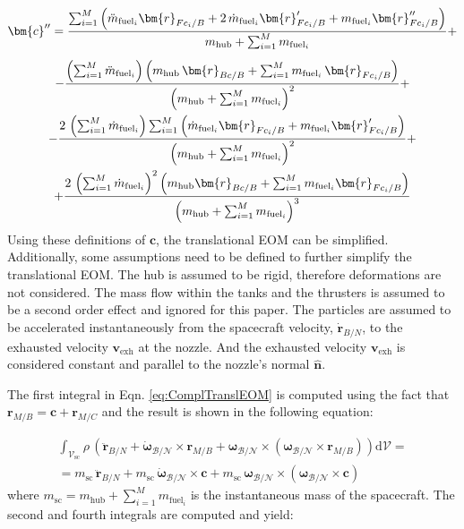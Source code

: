\begin{multline}\label{eq:eq18}
	\bm{c}'' = \frac{\sum_{i=1}^{M}\left(\ddot{m}_{\text{fuel}_i}\bm{r}_{Fc_i/B} +2\,\dot{m}_{\text{fuel}_i}\bm{r}'_{Fc_i/B}+ m_{\text{fuel}_i}\bm{r}''_{Fc_i/B}\right)}{m_{\text{hub}}+ \sum_{i=1}^{M}m_{\text{fuel}_i}} + \vspace{5pt}\\
	- \frac{\left(\sum_{i=1}^{M}\ddot{m}_{\text{fuel}_i}\right)\left(m_{\text{hub}}\,\bm{r}_{Bc/B} + \sum_{i=1}^{M}m_{\text{fuel}_i}\,\bm{r}_{Fc_i/B}\right)  }{\left(m_{\text{hub}}+ \sum_{i=1}^{M}m_{\text{fuel}_i}\right)^2} +\\-
	\frac{2\,\left(\sum_{i=1}^{M}\dot{m}_{\text{fuel}_i}\right)\sum_{i=1}^{M}\left(\dot{m}_{\text{fuel}_i}\bm{r}_{Fc_i/B} + m_{\text{fuel}_i}\bm{r}'_{Fc_i/B}\right) }{\left(m_{\text{hub}}+ \sum_{i=1}^{M}m_{\text{fuel}_i}\right)^2} +\\
	+ \frac{2\,\left(\sum_{i=1}^{M}\dot{m}_{\text{fuel}_i}\right)^2\left(m_{\text{hub}}\bm{r}_{Bc/B} +\sum_{i=1}^{M} m_{\text{fuel}_i}\bm{r}_{Fc_i/B}\right)}{\left(m_{\text{hub}}+ \sum_{i=1}^{M}m_{\text{fuel}_i}\right)^3}
\end{multline}
Using these definitions of $\bm c$, the translational EOM can be simplified. Additionally, some assumptions need to be defined to further simplify the translational EOM. The hub is assumed to be rigid, therefore deformations are not considered. The mass flow within the tanks and the thrusters is assumed to be a second order effect and ignored for this paper. The particles are assumed to be accelerated instantaneously from the spacecraft velocity, $\dot{\bm{r}}_{B/N}$, to the exhausted velocity $\bm{v}_{\text{exh}}$ at the nozzle. And the exhausted velocity $\bm{v}_{\text{exh}}$ is considered constant and parallel to the nozzle's normal $\hat{\bm{n}}$.

The first integral in Eqn. \eqref{eq:ComplTranslEOM} is computed using the fact that $\bm{r}_{M/B} = \bm{c} + \bm{r}_{M/C}$ and the result is shown in the following equation:

\begin{multline}\label{eq:eq19}
	\int_{\mathcal{V}_{\text{sc}}}\rho\,\left(\ddot{\bm{r}}_{B/N} + \dot{\bm{\omega}}_{\mathcal{B}/\mathcal{N}}\times\bm{r}_{M/B} + \bm{\omega}_{\mathcal{B}/\mathcal{N}} \times\left(\bm{\omega}_{\mathcal{B}/\mathcal{N}} \times\bm{r}_{M/B}\right)\right)\text{d}\mathcal{V} = \\=
	m_{\text{sc}} \,\bm{\ddot{r}}_{B/N} + m_{\text{sc}}\,\bm{\dot{\omega}}_{\mathcal{B}/\mathcal{N}} \times\bm{c} + m_{\text{sc}}\,\bm{\omega}_{\mathcal{B}/\mathcal{N}} \times\left(\bm{\omega}_{\mathcal{B}/\mathcal{N}}\times\bm{c}\right)
\end{multline}
\noindent
where $m_{\text{sc}}=m_{\text{hub}}+ \sum_{i=1}^{M}m_{\text{fuel}_i}$ is the instantaneous mass of the spacecraft. The second and fourth integrals are computed and yield:

